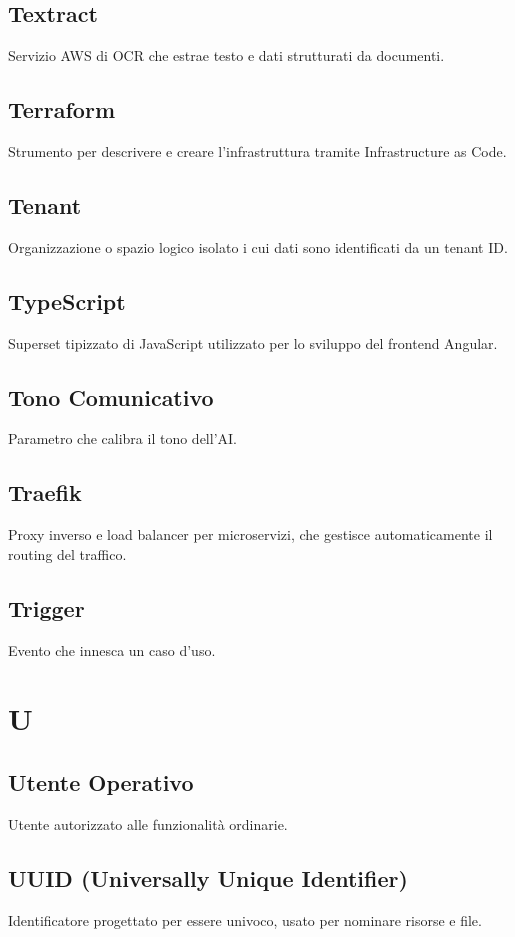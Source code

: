 \documentclass[a4paper,12pt]{article}
\begin{document}
\subsection{Textract}
Servizio AWS di OCR che estrae testo e dati strutturati da documenti.

\subsection{Terraform}
Strumento per descrivere e creare l'infrastruttura tramite Infrastructure as Code.

\subsection{Tenant}
Organizzazione o spazio logico isolato i cui dati sono identificati da un tenant ID.

\subsection{TypeScript}
Superset tipizzato di JavaScript utilizzato per lo sviluppo del frontend Angular.

\subsection{Tono Comunicativo}
Parametro che calibra il tono dell'AI.

\subsection{Traefik}
Proxy inverso e load balancer per microservizi, che gestisce automaticamente il routing del traffico.

\subsection{Trigger}
Evento che innesca un caso d'uso.

\section{U}
\subsection{Utente Operativo}
Utente autorizzato alle funzionalità ordinarie.

\subsection{UUID (Universally Unique Identifier)}
Identificatore progettato per essere univoco, usato per nominare risorse e file.
\end{document}
